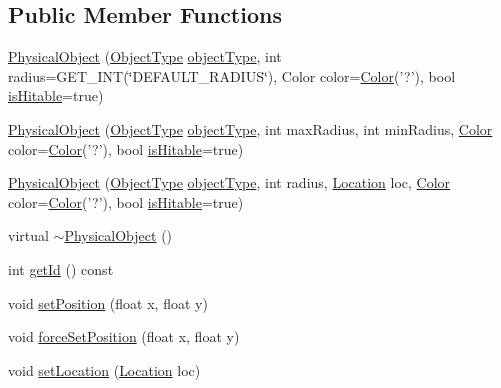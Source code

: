 \subsection*{Public Member Functions}
\begin{DoxyCompactItemize}
\item 
\hyperlink{classPhysicalObject_a2fbf277629a4b9dec946be7241d034f4}{Physical\-Object} (\hyperlink{PhysicalObject_8h_a842c5e2e69277690b064bf363c017980}{Object\-Type} \hyperlink{classPhysicalObject_a59060233e54004b24fc03ed786b46dd3}{object\-Type}, int radius=G\-E\-T\-\_\-\-I\-N\-T(\char`\"{}D\-E\-F\-A\-U\-L\-T\-\_\-\-R\-A\-D\-I\-U\-S\char`\"{}), Color color=\hyperlink{structColor}{Color}('?'), bool \hyperlink{classPhysicalObject_a5afc803dac6415f86fcda81983b75e41}{is\-Hitable}=true)
\item 
\hyperlink{classPhysicalObject_a9a132760e19b893b51deb542dc53a859}{Physical\-Object} (\hyperlink{PhysicalObject_8h_a842c5e2e69277690b064bf363c017980}{Object\-Type} \hyperlink{classPhysicalObject_a59060233e54004b24fc03ed786b46dd3}{object\-Type}, int max\-Radius, int min\-Radius, \hyperlink{structColor}{Color} color=\hyperlink{structColor}{Color}('?'), bool \hyperlink{classPhysicalObject_a5afc803dac6415f86fcda81983b75e41}{is\-Hitable}=true)
\item 
\hyperlink{classPhysicalObject_afc9f843a4c6083587ce2e20a091d0a79}{Physical\-Object} (\hyperlink{PhysicalObject_8h_a842c5e2e69277690b064bf363c017980}{Object\-Type} \hyperlink{classPhysicalObject_a59060233e54004b24fc03ed786b46dd3}{object\-Type}, int radius, \hyperlink{structLocation}{Location} loc, \hyperlink{structColor}{Color} color=\hyperlink{structColor}{Color}('?'), bool \hyperlink{classPhysicalObject_a5afc803dac6415f86fcda81983b75e41}{is\-Hitable}=true)
\item 
virtual \hyperlink{classPhysicalObject_a473fb6a285d967b295e4c700c341afe4}{$\sim$\-Physical\-Object} ()
\item 
int \hyperlink{classPhysicalObject_a71514ab30d4543a2720fd4ac0f3f6401}{get\-Id} () const 
\item 
void \hyperlink{classPhysicalObject_ac130b3a86fa816eee60783e0120b7d98}{set\-Position} (float x, float y)
\item 
void \hyperlink{classPhysicalObject_a9c562fb0b7e468d4b6d9a1a429791236}{force\-Set\-Position} (float x, float y)
\item 
void \hyperlink{classPhysicalObject_a0ffd9a9890787fdcfe31ebbf2931aff5}{set\-Location} (\hyperlink{structLocation}{Location} loc)
\item 

\end{DoxyCompactItemize}
